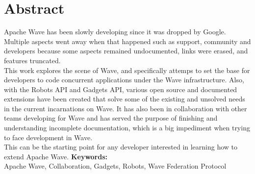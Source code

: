 \newpage
\renewcommand{\thepage}{\Roman{page}}
\setcounter{page}{7}
\section*{Abstract}
Apache Wave has been slowly developing since it was dropped by Google. Multiple aspects went away when that happened such as support, community and developers because some aspects remained undocumented, links were erased, and features truncated.\\[.2cm]
This work explores the scene of Wave, and specifically attemps to set the base for developers to code concurrent applications under the Wave infrastructure. Also, with the Robots API and Gadgets API, various open source and documented extensions have been created that solve some of the existing and unsolved needs in the current incarnations on Wave. It has also been in collaboration with other teams developing for Wave and has served the purpose of finishing and understanding incomplete documentation, which is a big impediment when trying to face development in Wave.\\[.2cm]
This can be the starting point for any developer interested in learning how to extend Apache Wave.
\vfill
{\large \bf Keywords:}\\
{\large Apache Wave, Collaboration, Gadgets, Robots, Wave Federation Protocol}
